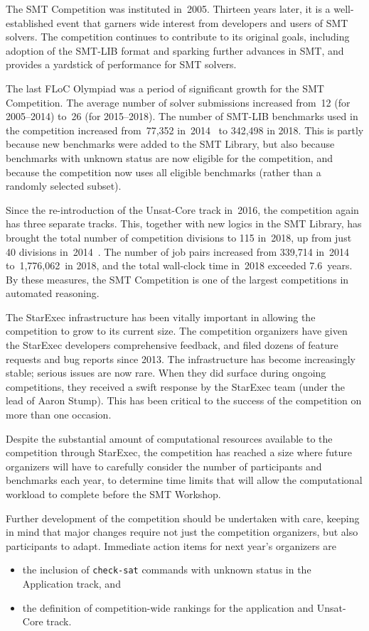 \documentclass[dvipsnames,table,twoside,11pt]{article}
\begin{document}
The SMT Competition was instituted in~2005.  Thirteen years later, it
is a well-established event that garners wide interest from developers
and users of SMT solvers.  The competition continues to contribute to
its original goals, including adoption of the SMT-LIB format and
sparking further advances in SMT, and provides a yardstick of
performance for SMT solvers.

The last FLoC Olympiad was a period of significant growth for the SMT
Competition.  The average number of solver submissions increased
from~12 (for 2005--2014) to~26 (for 2015--2018).  The number of
SMT-LIB benchmarks used in the competition increased from~77,352
in~2014~\cite{CDW14} to 342,498 in 2018.  This is partly because new
benchmarks were added to the SMT Library, but also because benchmarks
with unknown status are now eligible for the competition, and because
the competition now uses all eligible benchmarks (rather than a
randomly selected subset).

Since the re-introduction of the Unsat-Core track in~2016, the
competition again has three separate tracks.  This, together with new
logics in the SMT Library, has brought the total number of competition
divisions to 115 in~2018, up from just 40 divisions
in~2014~\cite{CDW14}.  The number of job pairs increased from 339,714
in~2014 to~1,776,062~in 2018, and the total wall-clock time in~2018
exceeded 7.6~years.  By these measures, the SMT Competition is one of
the largest competitions in automated reasoning.

The StarExec infrastructure has been vitally important in allowing the
competition to grow to its current size.  The competition organizers
have given the StarExec developers comprehensive feedback, and filed
dozens of feature requests and bug reports since 2013.  The
infrastructure has become increasingly stable; serious issues are now
rare.  When they did surface during ongoing competitions, they
received a swift response by the StarExec team (under the lead of
Aaron Stump).  This has been critical to the success of the
competition on more than one occasion.

Despite the substantial amount of computational resources available to
the competition through StarExec, the competition has reached a size
where future organizers will have to carefully consider the number of
participants and benchmarks each year, to determine time limits that
will allow the computational workload to complete before the SMT
Workshop.

Further development of the competition should be undertaken with care,
keeping in mind that major changes require not just the competition
organizers, but also participants to adapt.  Immediate action items
for next year's organizers are
\begin{itemize}
\item the inclusion of {\tt check-sat} commands with unknown status in
  the Application track, and
\item the definition of competition-wide rankings for the application
  and Unsat-Core track.
\end{itemize}
\end{document}
